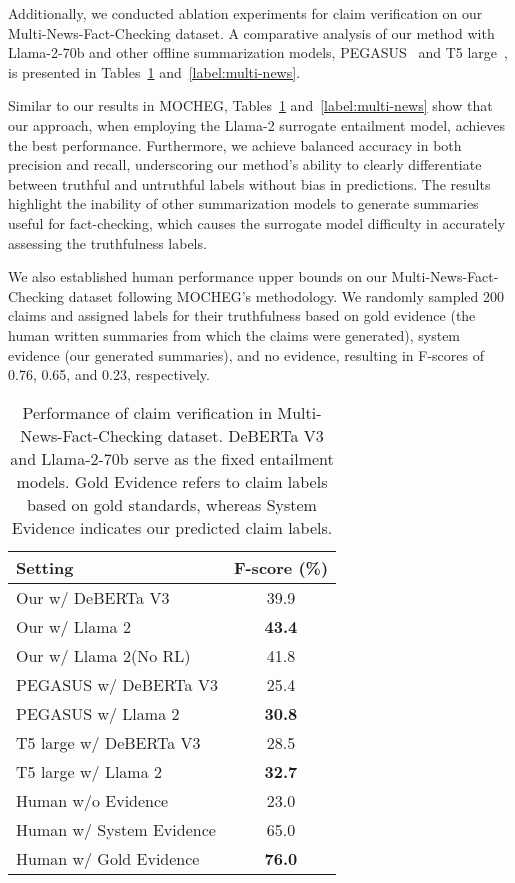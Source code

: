 Additionally, we conducted ablation experiments for claim verification on our Multi-News-Fact-Checking dataset. A comparative analysis of our method with Llama-2-70b and other offline summarization models, PEGASUS~\cite{zhang2020pegasus} and T5 large~\cite{2020t5}, is presented in Tables~\ref{label:multi-news_fscore} and~\ref{label:multi-news}.

Similar to our results in MOCHEG, Tables~\ref{label:multi-news_fscore} and~\ref{label:multi-news} show that our approach, when employing the Llama-2 surrogate entailment model, achieves the best performance. Furthermore, we achieve balanced accuracy in both precision and recall, underscoring our method's ability to clearly differentiate between truthful and untruthful labels without bias in predictions. The results highlight the inability of other summarization models to generate summaries useful for fact-checking, which causes the surrogate model difficulty in accurately assessing the truthfulness labels.

We also established human performance upper bounds on our Multi-News-Fact-Checking dataset following MOCHEG's methodology. We randomly sampled 200 claims and assigned labels for their truthfulness based on gold evidence (the human written summaries from which the claims were generated), system evidence (our generated summaries), and no evidence, resulting in F-scores of 0.76, 0.65, and 0.23, respectively.

\begin{table}[h]\small
\centering
\caption{Performance of claim verification in Multi-News-Fact-Checking dataset. DeBERTa V3 and Llama-2-70b serve as the fixed entailment models. Gold Evidence refers to claim labels based on gold standards, whereas System Evidence indicates our predicted claim labels.}
\begin{tabular}{l|c}
\hline
\textbf{Setting}             & \textbf{F-score (\%)} \\\hline
Our w/ DeBERTa V3               & 39.9                 \\
Our w/ Llama 2               & \textbf{43.4}        \\
Our w/ Llama 2(No RL)               & 41.8            \\\hline
PEGASUS w/ DeBERTa V3           & 25.4                 \\
PEGASUS w/ Llama 2           & \textbf{30.8}            \\\hline
T5 large w/ DeBERTa V3          & 28.5            \\
T5 large w/ Llama 2          & \textbf{32.7}            \\\hline
Human w/o Evidence           & 23.0            \\
Human w/ System Evidence     & 65.0               \\
Human w/ Gold Evidence       & \textbf{76.0}               \\ \hline
\end{tabular}
\label{label:multi-news_fscore}
\end{table}

